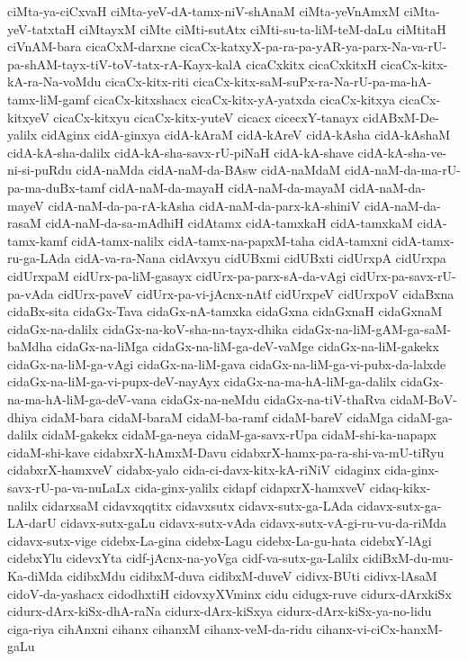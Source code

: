 {ciMta-ya-ciCxvaH
ciMta-yeV-dA-tamx-niV-shAnaM
ciMta-yeVnAmxM
ciMta-yeV-tatxtaH
ciMtayxM
ciMte
ciMti-sutAtx
ciMti-su-ta-liM-teM-daLu
ciMtitaH
ciVnAM-bara
cicaCxM-darxne
cicaCx-katxyX-pa-ra-pa-yAR-ya-parx-Na-va-rU-pa-shAM-tayx-tiV-toV-tatx-rA-Kayx-kalA
cicaCxkitx
cicaCxkitxH
cicaCx-kitx-kA-ra-Na-voMdu
cicaCx-kitx-riti
cicaCx-kitx-saM-suPx-ra-Na-rU-pa-ma-hA-tamx-liM-gamf
cicaCx-kitxshacx
cicaCx-kitx-yA-yatxda
cicaCx-kitxya
cicaCx-kitxyeV
cicaCx-kitxyu
cicaCx-kitx-yuteV
cicacx
cicecxY-tanayx
cidABxM-De-yalilx
cidAginx
cidA-ginxya
cidA-kAraM
cidA-kAreV
cidA-kAsha
cidA-kAshaM
cidA-kA-sha-dalilx
cidA-kA-sha-savx-rU-piNaH
cidA-kA-shave
cidA-kA-sha-ve-ni-si-puRdu
cidA-naMda
cidA-naM-da-BAsw
cidA-naMdaM
cidA-naM-da-ma-rU-pa-ma-duBx-tamf
cidA-naM-da-mayaH
cidA-naM-da-mayaM
cidA-naM-da-mayeV
cidA-naM-da-pa-rA-kAsha
cidA-naM-da-parx-kA-shiniV
cidA-naM-da-rasaM
cidA-naM-da-sa-mAdhiH
cidAtamx
cidA-tamxkaH
cidA-tamxkaM
cidA-tamx-kamf
cidA-tamx-nalilx
cidA-tamx-na-papxM-taha
cidA-tamxni
cidA-tamx-ru-ga-LAda
cidA-va-ra-Nana
cidAvxyu
cidUBxmi
cidUBxti
cidUrxpA
cidUrxpa
cidUrxpaM
cidUrx-pa-liM-gasayx
cidUrx-pa-parx-sA-da-vAgi
cidUrx-pa-savx-rU-pa-vAda
cidUrx-paveV
cidUrx-pa-vi-jAcnx-nAtf
cidUrxpeV
cidUrxpoV
cidaBxna
cidaBx-sita
cidaGx-Tava
cidaGx-nA-tamxka
cidaGxna
cidaGxnaH
cidaGxnaM
cidaGx-na-dalilx
cidaGx-na-koV-sha-na-tayx-dhika
cidaGx-na-liM-gAM-ga-saM-baMdha
cidaGx-na-liMga
cidaGx-na-liM-ga-deV-vaMge
cidaGx-na-liM-gakekx
cidaGx-na-liM-ga-vAgi
cidaGx-na-liM-gava
cidaGx-na-liM-ga-vi-pubx-da-lalxde
cidaGx-na-liM-ga-vi-pupx-deV-nayAyx
cidaGx-na-ma-hA-liM-ga-dalilx
cidaGx-na-ma-hA-liM-ga-deV-vana
cidaGx-na-neMdu
cidaGx-na-tiV-thaRva
cidaM-BoV-dhiya
cidaM-bara
cidaM-baraM
cidaM-ba-ramf
cidaM-bareV
cidaMga
cidaM-ga-dalilx
cidaM-gakekx
cidaM-ga-neya
cidaM-ga-savx-rUpa
cidaM-shi-ka-napapx
cidaM-shi-kave
cidabxrX-hAmxM-Davu
cidabxrX-hamx-pa-ra-shi-va-mU-tiRyu
cidabxrX-hamxveV
cidabx-yalo
cida-ci-davx-kitx-kA-riNiV
cidaginx
cida-ginx-savx-rU-pa-va-nuLaLx
cida-ginx-yalilx
cidapf
cidapxrX-hamxveV
cidaq-kikx-nalilx
cidarxsaM
cidavxqqtitx
cidavxsutx
cidavx-sutx-ga-LAda
cidavx-sutx-ga-LA-darU
cidavx-sutx-gaLu
cidavx-sutx-vAda
cidavx-sutx-vA-gi-ru-vu-da-riMda
cidavx-sutx-vige
cidebx-La-gina
cidebx-Lagu
cidebx-La-gu-hata
cidebxY-lAgi
cidebxYlu
cidevxYta
cidf-jAcnx-na-yoVga
cidf-va-sutx-ga-Lalilx
cidiBxM-du-mu-Ka-diMda
cidibxMdu
cidibxM-duva
cidibxM-duveV
cidivx-BUti
cidivx-lAsaM
cidoV-da-yashacx
cidodhxtiH
cidovxyXVminx
cidu
cidugx-ruve
cidurx-dArxkiSx
cidurx-dArx-kiSx-dhA-raNa
cidurx-dArx-kiSxya
cidurx-dArx-kiSx-ya-no-lidu
ciga-riya
cihAnxni
cihanx
cihanxM
cihanx-veM-da-ridu
cihanx-vi-ciCx-hanxM-gaLu
}
